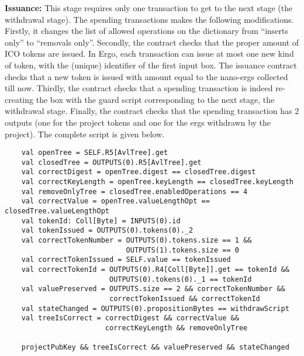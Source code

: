 \documentclass[runningheads]{llncs}
\begin{document}
\textbf{Issuance:}
This stage requires only one transaction to get to the next stage (the withdrawal stage). The spending transactions makes the following modifications. Firstly, it changes the list of allowed operations on the dictionary from ``inserts only'' to ``removals only''.
Secondly, the contract checks that the proper amount of ICO tokens are issued. In Ergo, each transaction can issue at most one new kind of token, with the (unique) identifier of the first input box. The issuance contract checks that a new token is issued with amount equal to the nano-ergs collected till now. Thirdly, the contract checks that a spending transaction is indeed re-creating the box with the guard script corresponding to the next stage, the withdrawal stage. 
Finally, the contract checks that the spending transaction has 2 outputs (one for the project tokens and one for the ergs withdrawn by the project).
The complete script is given below.
\small{
	\begin{verbatim}
	val openTree = SELF.R5[AvlTree].get
	val closedTree = OUTPUTS(0).R5[AvlTree].get
	val correctDigest = openTree.digest == closedTree.digest
	val correctKeyLength = openTree.keyLength == closedTree.keyLength
	val removeOnlyTree = closedTree.enabledOperations == 4
	val correctValue = openTree.valueLengthOpt == closedTree.valueLengthOpt
	val tokenId: Coll[Byte] = INPUTS(0).id
	val tokenIssued = OUTPUTS(0).tokens(0)._2
	val correctTokenNumber = OUTPUTS(0).tokens.size == 1 && 
	                         OUTPUTS(1).tokens.size == 0
	val correctTokenIssued = SELF.value == tokenIssued
	val correctTokenId = OUTPUTS(0).R4[Coll[Byte]].get == tokenId &&
	                     OUTPUTS(0).tokens(0)._1 == tokenId
	val valuePreserved = OUTPUTS.size == 2 && correctTokenNumber && 
	                     correctTokenIssued && correctTokenId
	val stateChanged = OUTPUTS(0).propositionBytes == withdrawScript
	val treeIsCorrect = correctDigest && correctValue && 
	                    correctKeyLength && removeOnlyTree
	
	projectPubKey && treeIsCorrect && valuePreserved && stateChanged
	\end{verbatim}
}
\end{document}
